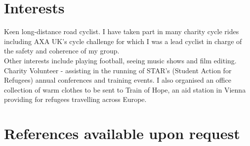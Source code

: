 \documentclass[12pt]{article}
\begin{document}
\section*{Interests}

Keen long-distance road cyclist. I have taken part in many charity cycle rides including AXA UK's cycle challenge for which I was a lead cyclist in charge of the safety and coherence of my group.\\

\noindent Other interests include playing football, seeing music shows and film editing.\\

\noindent Charity Volunteer - assisting in the running of STAR's (Student Action for Refugees) annual conferences and training events.
I also organised an office collection of warm clothes to be sent to Train of Hope, an aid station in Vienna providing for refugees travelling across Europe.

\section*{References available upon request}
\end{document}
